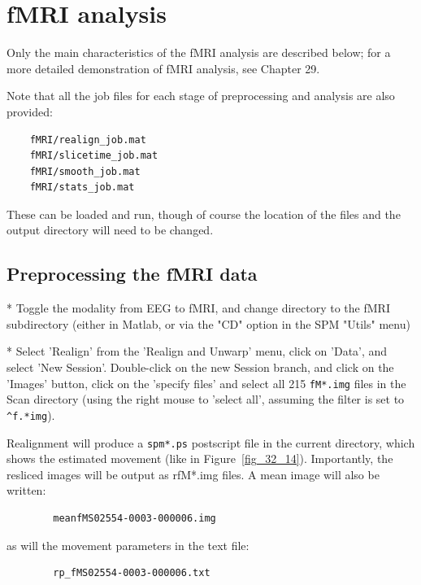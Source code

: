 \section{fMRI analysis \label{fMRI}}

Only the main characteristics of the fMRI analysis are described below; for a more detailed demonstration of fMRI analysis, see Chapter 29.

Note that all the job files for each stage of preprocessing and analysis are also provided:
\begin{verbatim}
	fMRI/realign_job.mat
	fMRI/slicetime_job.mat
	fMRI/smooth_job.mat
	fMRI/stats_job.mat
\end{verbatim}
These can be loaded and run, though of course the location of the files and the output directory will need to be changed.

\subsection{Preprocessing the fMRI data}

* Toggle the modality from EEG to fMRI, and change directory to the fMRI subdirectory (either in Matlab, or via the "CD" option in the SPM "Utils" menu)

* Select 'Realign' from the 'Realign and Unwarp' menu, click on 'Data', and select 'New Session'. Double-click on the new Session branch, and click on the 'Images' button, click on the 'specify files' and select all 215 \verb!fM*.img! files in the Scan directory (using the right mouse to 'select all', assuming the filter is set to \verb!^f.*img!).

Realignment will produce a \verb!spm*.ps! postscript file in the current directory, which shows the estimated movement (like in Figure~\ref{fig_32_14}). Importantly, the resliced images will be output as rfM*.img files. A mean image will also be written:
\begin{verbatim}
		meanfMS02554-0003-000006.img
\end{verbatim}
as will the movement parameters in the text file:
\begin{verbatim}
		rp_fMS02554-0003-000006.txt
\end{verbatim}

